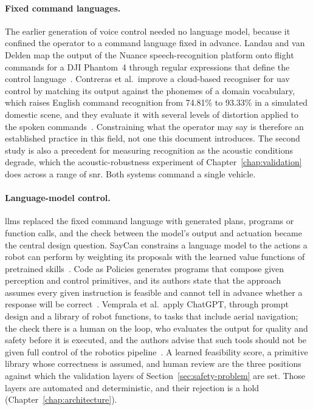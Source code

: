\paragraph{Fixed command languages.} The earlier generation of voice control needed no language
model, because it confined the operator to a command language fixed in advance. Landau and van
Delden map the output of the Nuance speech-recognition platform onto flight commands for a DJI
Phantom~4 through regular expressions that define the control language~\cite{landau2017}.
Contreras et al.\ improve a cloud-based recogniser for \gls{uav} control by matching its output
against the phonemes of a domain vocabulary, which raises English command recognition from 74.81\%
to 93.33\% in a simulated domestic scene, and they evaluate it with several levels of distortion
applied to the spoken commands~\cite{contreras2020}. Constraining what the operator may say is
therefore an established practice in this field, not one this document introduces. The second study
is also a precedent for measuring recognition as the acoustic conditions degrade, which the
acoustic-robustness experiment of Chapter~\ref{chap:validation} does across a range of \gls{snr}.
Both systems command a single vehicle.

\paragraph{Language-model control.} \Glspl{llm} replaced the fixed command language
with generated plans, programs or function calls, and the check between the model's output and
actuation became the central design question. SayCan constrains a language model to the actions a
robot can perform by weighting its proposals with the learned value functions of pretrained
skills~\cite{saycan2022}. Code as Policies generates programs that compose given perception and
control primitives, and its authors state that the approach assumes every given instruction is
feasible and cannot tell in advance whether a response will be correct~\cite{codeaspolicies2023}.
Vemprala et al.\ apply ChatGPT, through prompt design and a library of robot functions, to tasks
that include aerial navigation; the check there is a human on the loop, who evaluates the output for
quality and safety before it is executed, and the authors advise that such tools should not be given
full control of the robotics pipeline~\cite{chatgptrobotics2024}. A learned feasibility score, a
primitive library whose correctness is assumed, and human review are the three positions against
which the validation layers of Section~\ref{sec:safety-problem} are set. Those layers are automated
and deterministic, and their rejection is a hold (Chapter~\ref{chap:architecture}).

